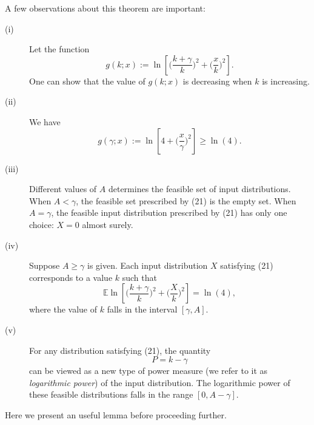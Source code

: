 \documentclass[conference]{IEEEtran}
\newcommand{\E}{\mathbb{E}}
\theoremstyle{definition}
\theoremstyle{plain}
\begin{document}

















\iffalse
A few observations about this theorem are important:
\begin{description}
\item[(i)] Let the function
\begin{equation}
    g(k;x) := \ln \left[
    \Big(\frac{k+\gamma}{k}\Big)^2
    +\Big(\frac{x}{k}\Big)^2
    \right].
\end{equation}
One can show that the value of $g(k;x)$ is decreasing when $k$ is increasing.
\item[(ii)]
We have
\begin{equation}
    g(\gamma;x) := \ln \left[
    4
    +\Big(\frac{x}{\gamma}\Big)^2
    \right] \geq \ln(4).
\end{equation}
\item[(iii)]
Different values of $A$ determines the feasible set of input distributions. When $A<\gamma$, the feasible set prescribed by (21) is the empty set. When $A=\gamma$, the feasible input distribution prescribed by (21) has only one choice: $X=0$ almost surely.
\item[(iv)]
Suppose $A\geq \gamma$ is given.
Each input distribution $X$ satisfying (21) corresponds to a value $k$ such that
\begin{equation}
\E \ln \left[
    \Big(\frac{k+\gamma}{k}\Big)^2
    +\Big(\frac{X}{k}\Big)^2
    \right] = \ln(4),
\end{equation}
where the value of $k$ falls in
the interval $[\gamma,A]$.
\item[(v)]
For any distribution satisfying
(21), the quantity 
\begin{equation}
    P=k-\gamma
\end{equation}
can be viewed as a new type of power measure (we refer to it as \textit{logarithmic power}) of the input distribution. The logarithmic power of these feasible distributions falls in the range $[0,A-\gamma]$.
\end{description}
Here we present an useful lemma before proceeding further.
\end{document}

